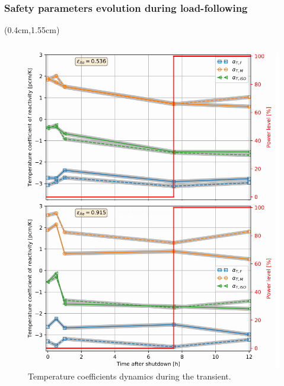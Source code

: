\begin{frame}
\frametitle{Safety parameters evolution during load-following}
\begin{textblock*}{12.5cm}(0.4cm,1.55cm) %
	\begin{columns}
		\column[t]{6.3cm}
		\begin{figure}[t]
			\begin{overprint}
				\includegraphics[width=0.87\linewidth]{./images/msbr_tc_evo.png}
				\vspace{-2mm}
				\caption{Temperature coefficients dynamics during the 
				transient.}

\end{overprint}
\end{figure}
\end{columns}
\end{textblock*}
\end{frame}
